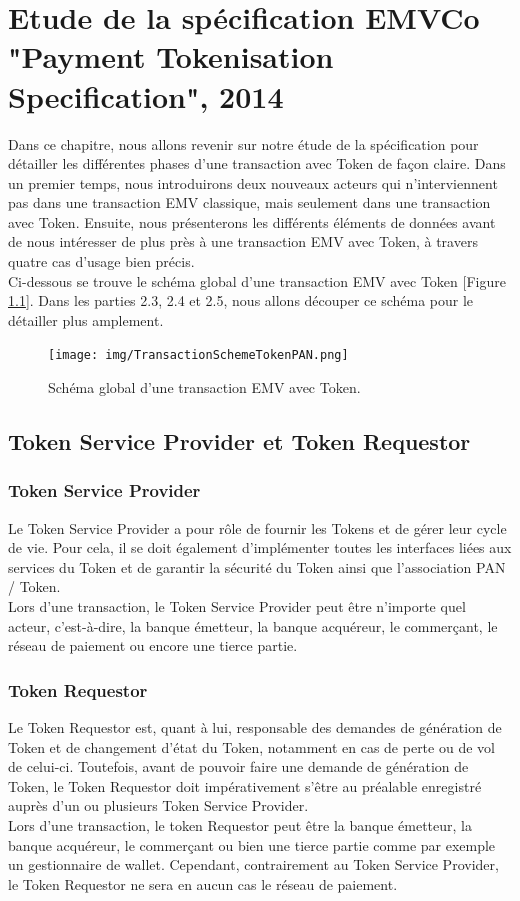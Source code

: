 \documentclass{report}
\begin{document}
\chapter{Etude de la spécification EMVCo "Payment Tokenisation Specification", 2014}
Dans ce chapitre, nous allons revenir sur notre étude de la spécification pour détailler les différentes phases d'une transaction avec Token de façon claire. Dans un premier temps, nous introduirons deux nouveaux acteurs qui n'interviennent pas dans une transaction EMV classique, mais seulement dans une transaction avec Token. Ensuite, nous présenterons les différents éléments de données avant de nous intéresser de plus près à une transaction EMV avec Token, à travers quatre cas d'usage bien précis.\\

\noindent
Ci-dessous se trouve le schéma global d'une transaction EMV avec Token [Figure \ref{TransactionScheme}]. Dans les parties 2.3, 2.4 et 2.5, nous allons découper ce schéma pour le détailler plus amplement.

\begin{figure}[!ht]
    \centering
			\texttt{[image: img/TransactionSchemeTokenPAN.png]}
			\caption{\label{TransactionScheme} Schéma global d'une transaction EMV avec Token.}			
\end{figure}

 
\section{Token Service Provider et Token Requestor}
\subsection{Token Service Provider}
Le Token Service Provider a pour rôle de fournir les Tokens et de gérer leur cycle de vie. Pour cela, il se doit également d'implémenter toutes les interfaces liées aux services du Token et de garantir la sécurité du Token ainsi que l'association PAN / Token.\\
Lors d'une transaction, le Token Service Provider peut être n'importe quel acteur, c'est-à-dire, la banque émetteur, la banque acquéreur, le commerçant, le réseau de paiement ou encore une tierce partie.

\subsection{Token Requestor}
Le Token Requestor est, quant à lui, responsable des demandes de génération de Token et de changement d'état du Token, notamment en cas de perte ou de vol de celui-ci. Toutefois, avant de pouvoir faire une demande de génération de Token, le Token Requestor doit impérativement s'être au préalable enregistré auprès d'un ou plusieurs Token Service Provider.\\
Lors d'une transaction, le token Requestor peut être la banque émetteur, la banque acquéreur, le commerçant ou bien une tierce partie comme par exemple un gestionnaire de wallet. Cependant, contrairement au Token Service Provider, le Token Requestor ne sera en aucun cas le réseau de paiement.
\end{document}

